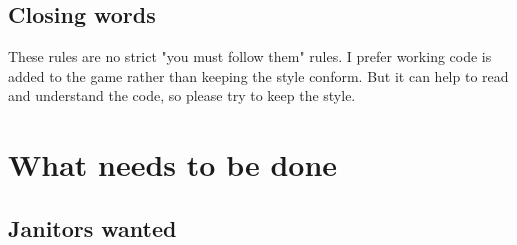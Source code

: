\documentclass{report}
\begin{document}
    \subsection{Closing words}

      These rules are no strict "you must follow them" rules. I prefer
      working code is added to the game rather than keeping the style
      conform. But it can help to read and understand the code, so
      please try to keep the style.
    
    \section{What needs to be done}

    \subsection{Janitors wanted}


 
\end{document}

